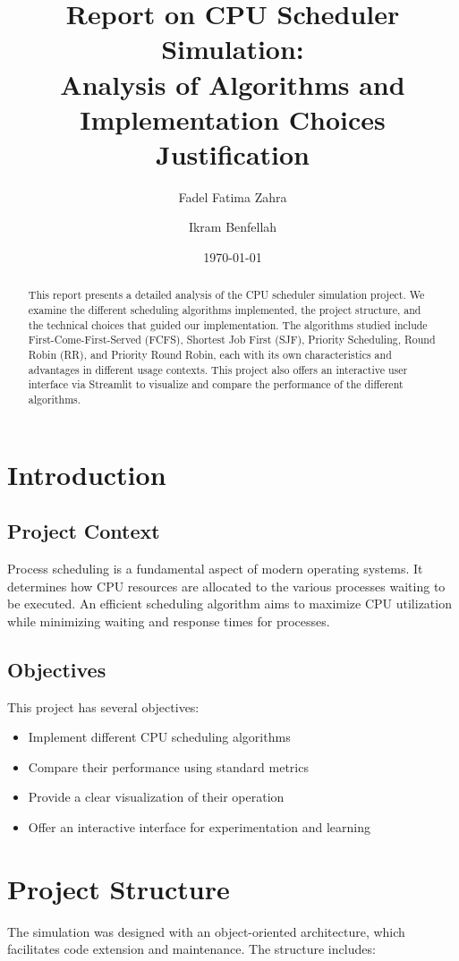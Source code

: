 \documentclass[12pt,a4paper]{article}
\title{Report on CPU Scheduler Simulation: \\
Analysis of Algorithms and Implementation Choices Justification}
\author{Fadel Fatima Zahra \and Ikram Benfellah}
\date{\today}
\begin{document}
\maketitle

\begin{abstract}
This report presents a detailed analysis of the CPU scheduler simulation project. We examine the different scheduling algorithms implemented, the project structure, and the technical choices that guided our implementation. The algorithms studied include First-Come-First-Served (FCFS), Shortest Job First (SJF), Priority Scheduling, Round Robin (RR), and Priority Round Robin, each with its own characteristics and advantages in different usage contexts. This project also offers an interactive user interface via Streamlit to visualize and compare the performance of the different algorithms.
\end{abstract}

\tableofcontents

\newpage

\section{Introduction}
\subsection{Project Context}
Process scheduling is a fundamental aspect of modern operating systems. It determines how CPU resources are allocated to the various processes waiting to be executed. An efficient scheduling algorithm aims to maximize CPU utilization while minimizing waiting and response times for processes.

\subsection{Objectives}
This project has several objectives:
\begin{itemize}
    \item Implement different CPU scheduling algorithms
    \item Compare their performance using standard metrics
    \item Provide a clear visualization of their operation
    \item Offer an interactive interface for experimentation and learning
\end{itemize}

\section{Project Structure}
The simulation was designed with an object-oriented architecture, which facilitates code extension and maintenance. The structure includes:
\end{document}
